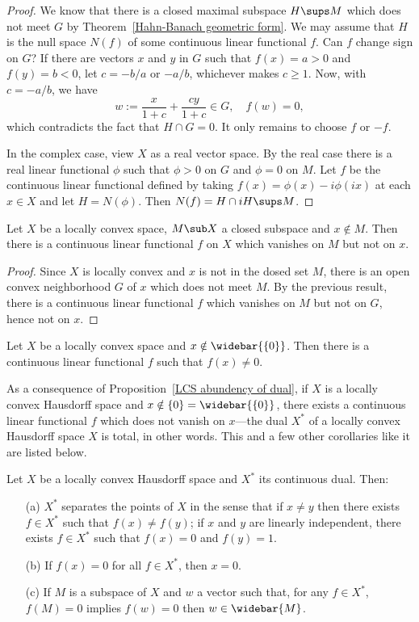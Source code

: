 \begin{proof}
We know that there is a closed maximal subspace $H\sups M$ which does not meet $G$ by Theorem~\ref{Hahn-Banach geometric form}. We may assume that $H$ is the null space $N(f)$ of some continuous linear functional $f$. Can $f$ change sign on $G$? If there are vectors $x$ and $y$ in $G$ such that $f(x)=a>0$ and $f(y)=b<0$, let $c=-b/a$ or $-a/b$, whichever makes $c\geq 1$. Now, with $c=-a/b$, we have
\[w:=\frac{x}{1+c}+\frac{cy}{1+c}\in G,\quad f(w)=0,\]
which contradicts the fact that $H\cap G=0$. It only remains to choose $f$ or $-f$.\par
In the complex case, view $X$ as a real vector space. By the real case there is a real linear functional $\phi$ such that $\phi>0$ on $G$ and $\phi=0$ on $M$. Let $f$ be the continuous linear functional defined by taking $f(x)=\phi(x)-i\phi(ix)$ at each $x\in X$ and let $H=N(\phi)$. Then $N(f)=H\cap iH\sups M$.
\end{proof}
\begin{proposition}\label{LCS separation of point with subspace}
Let $X$ be a locally convex space, $M\sub X$ a closed subspace and $x\notin M$. Then there is a continuous linear functional $f$ on $X$ which vanishes on $M$ but not on $x$.
\end{proposition}
\begin{proof}
Since $X$ is locally convex and $x$ is not in the dosed set $M$, there is an open convex neighborhood $G$ of $x$ which does not meet $M$. By the previous result, there is a continuous linear functional $f$ which vanishes on $M$ but not on $G$, hence not on $x$.
\end{proof}
\begin{proposition}\label{LCS abundency of dual}
Let $X$ be a locally convex space and $x\notin\widebar{\{0\}}$. Then there is a continuous linear functional $f$ such that $f(x)\neq 0$.
\end{proposition}
As a consequence of Proposition~\ref{LCS abundency of dual}, if $X$ is a locally convex Hausdorff space and $x\notin\{0\}=\widebar{\{0\}}$, there exists a continuous linear functional $f$ which does not vanish on $x$---the dual $X^*$ of a locally convex Hausdorff space $X$ is total, in other words. This and a few other corollaries like it are listed below.
\begin{proposition}\label{LCHS linear functional prop}
Let $X$ be a locally convex Hausdorff space and $X^*$ its continuous dual. Then:
\begin{itemize}
\item[(a)] $X^*$ separates the points of $X$ in the sense that if $x\neq y$ then there exists $f\in X^*$ such that $f(x)\neq f(y)$; if $x$ and $y$ are linearly independent, there exists $f\in X^*$ such that $f(x)=0$ and $f(y)=1$.
\item[(b)] If $f(x)=0$ for all $f\in X^*$, then $x=0$.
\item[(c)] If $M$ is a subspace of $X$ and $w$ a vector such that, for any $f\in X^*$, $f(M)=0$ implies $f(w)=0$ then $w\in\widebar{M}$.
\end{itemize}
\end{proposition}
